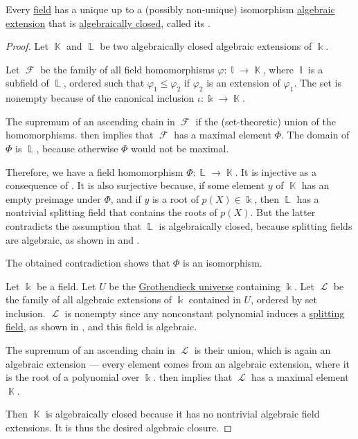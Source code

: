 \begin{proposition}\label{thm:algebraic_closure_existence}
  Every \hyperref[def:field]{field} has a unique up to a (possibly non-unique) isomorphism \hyperref[def:transcendental_element]{algebraic extension} that is \hyperref[def:algebraically_closed_field]{algebraically closed}, called its .
\end{proposition}
\begin{proof}
  \UniquenessSubProof Let \( \BbbK \) and \( \BbbL \) be two algebraically closed algebraic extensions of \( \Bbbk \).

  Let \( \mscrF \) be the family of all field homomorphisms \( \varphi: \Bbbl \to \BbbK \), where \( \Bbbl \) is a subfield of \( \BbbL \), ordered such that \( \varphi_1 \leq \varphi_2 \) if \( \varphi_2 \) is an extension of \( \varphi_1 \). The set is nonempty because of the canonical inclusion \( \iota: \Bbbk \to \BbbK \).

  The supremum of an ascending chain in \( \mscrF \) if the (set-theoretic) union of the homomorphisms.  then implies that \( \mscrF \) has a maximal element \( \Phi \). The domain of \( \Phi \) is \( \BbbL \), because otherwise \( \Phi \) would not be maximal.

  Therefore, we have a field homomorphism \( \Phi: \BbbL \to \BbbK \). It is injective as a consequence of . It is also surjective because, if some element \( y \) of \( \BbbK \) has an empty preimage under \( \Phi \), and if \( y \) is a root of \( p(X) \in \Bbbk \), then \( \BbbL \) has a nontrivial splitting field that contains the roots of \( p(X) \). But the latter contradicts the assumption that \( \BbbL \) is algebraically closed, because splitting fields are algebraic, as shown in  and .

  The obtained contradiction shows that \( \Phi \) is an isomorphism.

  \ExistenceSubProof Let \( \Bbbk \) be a field. Let \( U \) be the \hyperref[def:grothendieck_universe]{Grothendieck universe} containing \( \Bbbk \). Let \( \mscrL \) be the family of all algebraic extensions of \( \Bbbk \) contained in \( U \), ordered by set inclusion. \( \mscrL \) is nonempty since any nonconstant polynomial induces a \hyperref[def:splitting_field]{splitting field}, as shown in , and this field is algebraic.

  The supremum of an ascending chain in \( \mscrL \) is their union, which is again an algebraic extension --- every element comes from an algebraic extension, where it is the root of a polynomial over \( \Bbbk \).  then implies that \( \mscrL \) has a maximal element \( \BbbK \).

  Then \( \BbbK \) is algebraically closed because it has no nontrivial algebraic field extensions. It is thus the desired algebraic closure.
\end{proof}

